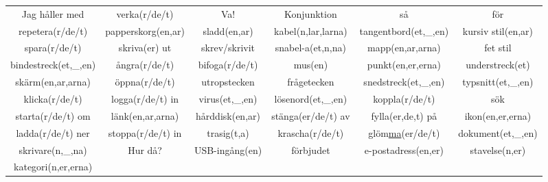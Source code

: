\begin{center}
\begin{adjustwidth}{-2.8cm}{}
\begin{tabular}{|c c c c c c|}
            Jag håller med & verka(r/de/t) & Va! & Konjunktion & så & för \\
            repetera(r/de/t) & papperskorg(en,ar) & sladd(en,ar) & kabel(n,lar,larna) & tangentbord(et,\_,en) & kursiv stil(en,ar) \\
            spara(r/de/t) & skriva(er) ut & skrev/skrivit & snabel-a(et,n,na) & mapp(en,ar,arna) & fet stil \\
            bindestreck(et,\_,en) & ångra(r/de/t) & bifoga(r/de/t) & mus(en) & punkt(en,er,erna) & understreck(et) \\
            skärm(en,ar,arna) & öppna(r/de/t) & utropstecken & frågetecken & snedstreck(et,\_,en) & typsnitt(et,\_,en) \\
            klicka(r/de/t) & logga(r/de/t) in & virus(et,\_,en) & lösenord(et,\_,en) & koppla(r/de/t) & sök \\
            starta(r/de/t) om & länk(en,ar,arna) & hårddisk(en,ar) & stänga(er/de/t) av & fylla(er,de,t) på & ikon(en,er,erna) \\
            ladda(r/de/t) ner & stoppa(r/de/t) in & trasig(t,a) & krascha(r/de/t) & glöm\underline{ma}(er/de/t) & dokument(et,\_,en) \\
            skrivare(n,\_,na) & Hur då? & USB-ingång(en) & förbjudet & e-postadress(en,er) & stavelse(n,er) \\
            kategori(n,er,erna) &  &  &  &  &  \\
            \hline
        \end{tabular}
    \end{adjustwidth}
\end{center}

